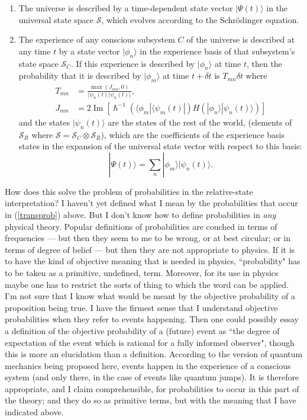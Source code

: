 \documentclass[12pt,a4paper,reqno]{article}
\renewcommand{\(}{\left(}
\renewcommand{\)}{\right)}
\renewcommand{\hbar}{\hslash}
\renewcommand{\S}{\mathcal{S}}
\newcommand{\ox}{\otimes}
\newcommand{\<}{\langle}
\renewcommand{\>}{\rangle}
\renewcommand{\Im}{\operatorname{Im}}
\theoremstyle{plain} %
\theoremstyle{definition}
\theoremstyle{remark}
\begin{document}
\begin{enumerate}
\item The universe is described by a time-dependent state vector 
$|\Psi(t)\>$ in the universal state space $\S$,
which evolves according to the Schr\"odinger equation. 
\item \label{transprob} The experience of any conscious subsystem $C$ of the universe is 
described at any time $t$ by a state vector $|\phi_n\>$ in the experience basis
of that subsystem's state space $\S_C$. If this experience is described by
$|\phi_n\>$ at time $t$, then the probability that it is described by
$|\phi_m\>$ at time $t+\delta t$ is $T_{mn}\delta t$ where
\begin{align}
T_{mn} &= \frac{\max(J_{mn},0)}{\<\psi_n(t)|\psi_n(t)\>},\\
J_{mn} &= 
2\Im\left[\hbar^{-1}\(\<\phi_m|\<\psi_m(t)|\)H\(|\phi_n\>|\psi_n(t)\>\)\right] 
\end{align}
and the states $|\psi_n(t)\>$ are the states of the rest of the world,
(elements of $\S_R$ where $\S = \S_C\ox\S_R$),
which are the coefficients of the experience basis states in the
expansion of the universal state vector with respect to this basis:
\[
|\Psi(t)\> = \sum_n|\phi_m\>|\psi_n(t)\>.
\]
\end{enumerate}

How does this solve the problem of probabilities in the relative-state
interpretation? I haven't yet defined what I mean by the probabilities
that occur in (\ref{transprob}) above. But I don't know how to define
probabilities in \emph{any} physical theory. Popular definitions of
probabilities are couched in terms of frequencies --- but then they seem
to me to be wrong, or at best circular; or in terms of degree
of belief --- but then they are not appropriate to physics. If it is
to have the kind of objective meaning that is needed in physics,
``probability" has to be taken as a primitive, undefined, term.
Moreover, for its use in physics maybe one has to restrict the sorts of
thing to which the word can be applied. I'm not sure that I know what
would be meant by the objective probability of a proposition being true.
I have the firmest sense that I understand objective probabilities when
they refer to events happening. Then one could possibly essay a
definition of the objective probability of a (future) event as ``the
degree of expectation of the event which is rational for a fully
informed observer", though this is more an elucidation
than a definition. According to the version of quantum
mechanics being proposed here, events happen in the experience of a
conscious system (and only there, in the case of events like quantum
jumps). It is therefore appropriate, and I claim comprehensible, for
probabilities to occur in this part of the theory; and they do so
as primitive terms, but with the meaning that I have indicated above.
\end{document}
